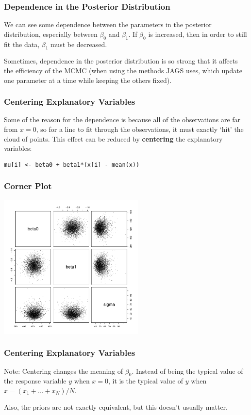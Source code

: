 \documentclass{beamer}
\begin{document}
\begin{frame}
\frametitle{Dependence in the Posterior Distribution}
We can see some dependence between the parameters in the posterior distribution,
especially between $\beta_0$ and $\beta_1$. If $\beta_0$ is increased, then
in order to still fit the data, $\beta_1$ must be decreased.\pause

Sometimes, dependence in the posterior distribution is so strong that it
affects the efficiency of the MCMC (when using the methods JAGS uses,
which update one parameter at a time while keeping the others fixed).
\end{frame}



\begin{frame}[fragile]
\frametitle{Centering Explanatory Variables}
Some of the reason for the dependence is because all of the observations
are far from $x=0$, so for a line to fit through the observations, it must
exactly `hit' the cloud of points. This effect can be reduced by {\bf centering}
the explanatory variables:

\begin{verbatim}
mu[i] <- beta0 + beta1*(x[i] - mean(x))
\end{verbatim}
\end{frame}

\begin{frame}
\frametitle{Corner Plot}
\begin{center}
\includegraphics[width=0.55\textwidth]{images/road_corner2.pdf}
\end{center}
\end{frame}

\begin{frame}[fragile]
\frametitle{Centering Explanatory Variables}
Note: Centering changes the meaning of $\beta_0$. Instead of being the typical
value of the response variable $y$ when $x=0$, it is the typical value of
$y$ when $x=(x_1 + ... + x_N)/N$.\pause

Also, the priors are not exactly equivalent, but this doesn't usually matter.
\end{frame}
\end{document}
